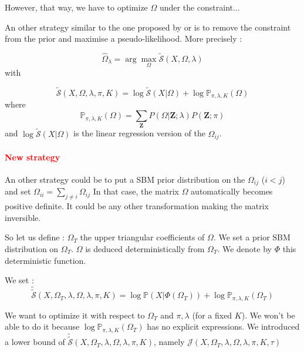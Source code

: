\documentclass[10pt]{article}
\begin{document}
However, that way, we have to optimize $\Omega$ under the constraint... 
 


\vspace{1em}



An other strategy similar to the one proposed by \cite{Marlin2009} or \cite{Sun2015} is  to remove the constraint from the prior and  maximise a pseudo-likelihood. More precisely : 

$$
\widehat \Omega_\lambda   = \arg \max_{\Omega} \widetilde{\mathcal{S}}(X,\Omega,\lambda) $$
with 


$$
 \widetilde{\mathcal{S}}(X,\Omega,\lambda,\pi,K)  =  \log \widetilde{\mathcal{S}}(X | \Omega)  +   \log \mathbb{P}_{\pi,\lambda,K}(\Omega) $$
where 
$$ \mathbb{P}_{\pi,\lambda,K}(\Omega) =   \sum_{\mathbf{Z}} P(\Omega |\mathbf{Z}; \lambda) P(\mathbf{Z}; \pi)$$
and 
$\log \widetilde{\mathcal{S}}(X | \Omega) $ is the linear regression version of the $\Omega_{ij}$. 



\vspace{1em} 

\paragraph{\textcolor{red}{New strategy}}
An other strategy could be to put a SBM prior distribution on the $\Omega_{ij}$ ($i<j$) and set $\Omega_{ii} = \sum_{j \neq i} \Omega_{ij}$
In that case, the matrix $\Omega$ automatically becomes  positive definite.  It could be any other transformation making the matrix inversible. 


So let us define : $ \Omega_T$ the upper triangular coefficients of $\Omega$. We set a prior SBM distribution on $\Omega_T$. 
$\Omega$ is deduced deterministically from $\Omega_T$.  We denote by $\Phi$ this deterministic function. 
 

We set : 
$$
 \widetilde{\widetilde{\mathcal{S}}}(X,\Omega_T,\lambda,\Omega,\lambda,\pi,K)  =  \log  \mathbb{P}(X | \Phi(\Omega_T))  +   \log \mathbb{P}_{\pi,\lambda,K}(\Omega_T) $$

We want to optimize it with respect to $\Omega_T$ and $\pi,\lambda$ (for a fixed $K$). We won't be able to do it because $  \log \mathbb{P}_{\pi,\lambda,K}(\Omega_T)$ has no explicit expressions. We introduced a lower bound of $\widetilde{\widetilde{\mathcal{S}}}(X,\Omega_T,\lambda,\Omega,\lambda,\pi,K)$, namely $\mathcal{J}(X,\Omega_T,\lambda,\Omega,\lambda,\pi,K,\tau)$
\end{document}
